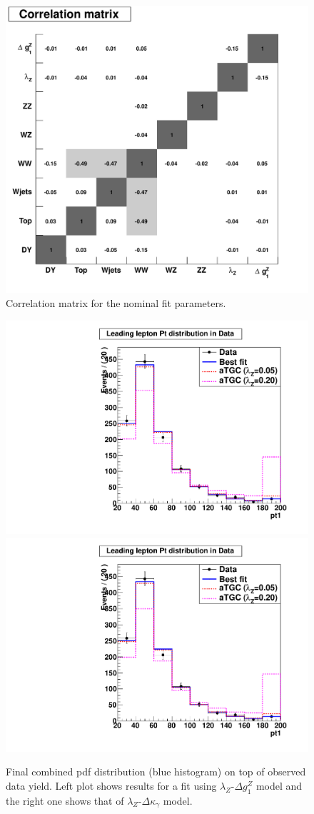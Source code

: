 \begin{figure}[tp]
  \centering
    \includegraphics[width=.60\textwidth]{figures/correlations}

  \caption[Fit parameter correlations] {Correlation matrix for the nominal fit parameters.}
  \label{fig:fit_correlations}
\end{figure}

\begin{figure}[tp]
  \centering
    \includegraphics[width=.45\textwidth]{figures/lz_dgz_pdf_data}
    \includegraphics[width=.45\textwidth]{figures/lz_dkg_pdf_data}

  \caption[Fit on data] {Final combined pdf distribution (blue
  histogram) on top of observed data yield. Left plot shows results
  for a fit using $\lambda_Z$-$\Delta g^Z_1$ model and the right one
  shows that of $\lambda_Z$-$\Delta\kappa_{\gamma}$ model.} \label{fig:fit_data}
\end{figure}

